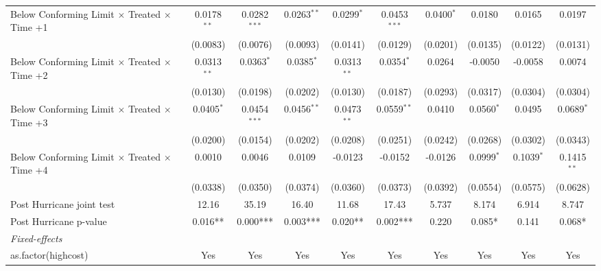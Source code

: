 \begin{tabular}{lccccccccc}
   Below Conforming Limit $\times$ Treated $\times$ Time +1   & 0.0178$^{**}$ & 0.0282$^{***}$ & 0.0263$^{**}$ & 0.0299$^{*}$  & 0.0453$^{***}$ & 0.0400$^{*}$  & 0.0180       & 0.0165       & 0.0197\\   
                                                              & (0.0083)      & (0.0076)       & (0.0093)      & (0.0141)      & (0.0129)       & (0.0201)      & (0.0135)     & (0.0122)     & (0.0131)\\   
   Below Conforming Limit $\times$ Treated $\times$ Time +2   & 0.0313$^{**}$ & 0.0363$^{*}$   & 0.0385$^{*}$  & 0.0313$^{**}$ & 0.0354$^{*}$   & 0.0264        & -0.0050      & -0.0058      & 0.0074\\   
                                                              & (0.0130)      & (0.0198)       & (0.0202)      & (0.0130)      & (0.0187)       & (0.0293)      & (0.0317)     & (0.0304)     & (0.0304)\\   
   Below Conforming Limit $\times$ Treated $\times$ Time +3   & 0.0405$^{*}$  & 0.0454$^{***}$ & 0.0456$^{**}$ & 0.0473$^{**}$ & 0.0559$^{**}$  & 0.0410        & 0.0560$^{*}$ & 0.0495       & 0.0689$^{*}$\\   
                                                              & (0.0200)      & (0.0154)       & (0.0202)      & (0.0208)      & (0.0251)       & (0.0242)      & (0.0268)     & (0.0302)     & (0.0343)\\   
   Below Conforming Limit $\times$ Treated $\times$ Time +4   & 0.0010        & 0.0046         & 0.0109        & -0.0123       & -0.0152        & -0.0126       & 0.0999$^{*}$ & 0.1039$^{*}$ & 0.1415$^{**}$\\   
                                                              & (0.0338)      & (0.0350)       & (0.0374)      & (0.0360)      & (0.0373)       & (0.0392)      & (0.0554)     & (0.0575)     & (0.0628)\\   
   Post Hurricane joint test                                  & 12.16         & 35.19          & 16.40         & 11.68         & 17.43          & 5.737         & 8.174        & 6.914        & 8.747\\  
   Post Hurricane p-value                                     & 0.016**       & 0.000***       & 0.003***      & 0.020**       & 0.002***       & 0.220         & 0.085*       & 0.141        & 0.068*\\  
   \midrule
   \emph{Fixed-effects}\\
   as.factor(highcost)                                        & Yes           & Yes            & Yes           & Yes           & Yes            & Yes           & Yes          & Yes          & Yes\\  

\end{tabular}
